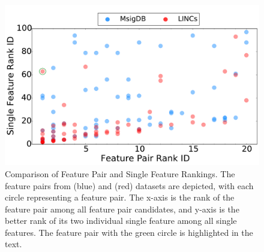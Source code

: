 \begin{figure}[h]
\vspace{-5mm}
 \centering
 \includegraphics[width=0.8\linewidth]{fig/better_rank_20.pdf}
 \vspace{-5mm}
\caption{Comparison of Feature Pair and Single Feature Rankings. The \toptwenty feature pairs from \msig (blue) and \lincs (red) datasets are depicted, with each circle representing a feature pair. The x-axis is the rank of the feature pair among all feature pair candidates, and y-axis is the better rank of its two individual single feature among all single features. The feature pair with the green circle is highlighted in the text. }
\vspace{-5mm}
\label{fig:better_rank_20}
\end{figure}

 

